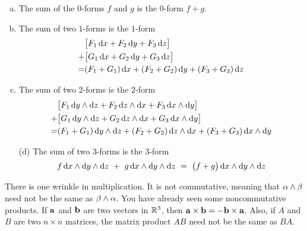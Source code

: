 \begin{defn}\label{def:differentialFormAdd}
\begin{enumerate}[(a)]
\item 
The sum of the $0$-forms  $f$ and $g$ is the $0$-form $f+g$.

\item
The sum of two $1$-forms is the $1$-form
\begin{align*} 
  &\big[F_1\,\mathrm{d}x
          + F_2\,\mathrm{d}y
          + F_3\,\mathrm{d}z\big] \\
  +&\big[G_1\,\mathrm{d}x
          + G_2\,\mathrm{d}y
          + G_3\,\mathrm{d}z\big] \\
 =& (F_1+G_1)\,\mathrm{d}x
          + (F_2+G_2)\,\mathrm{d}y
          + (F_3+G_3)\,\mathrm{d}z 
\end{align*}

\item
The sum of two $2$-forms is the $2$-form
\begin{align*} 
  &\big[F_1\,\mathrm{d}y\wedge\mathrm{d}z
          + F_2\,\mathrm{d}z\wedge\mathrm{d}x
          + F_3\,\mathrm{d}x\wedge\mathrm{d}y\big] \\
  +&\big[G_1\,\mathrm{d}y\wedge\mathrm{d}z
          + G_2\,\mathrm{d}z\wedge\mathrm{d}x
          + G_3\,\mathrm{d}x\wedge\mathrm{d}y\big] \\
  =&(F_1+G_1)\,\mathrm{d}y\wedge\mathrm{d}z
          + (F_2+G_2)\,\mathrm{d}z\wedge\mathrm{d}x
          + (F_3+G_3)\,\mathrm{d}x\wedge\mathrm{d}y 
\end{align*}

\end{enumerate}
\end{defn}

\addtocounter{theorem}{-1}
\begin{defn}[continued]
\begin{enumerate}[(a)]

\item[(d)]
The sum of two $3$-forms is the $3$-form
\begin{align*} 
   f\,\mathrm{d}x\wedge\mathrm{d}y\wedge\mathrm{d}z 
 \ +\  g\,\mathrm{d}x\wedge\mathrm{d}y\wedge\mathrm{d}z 
 \ =\  \big(f+g\big)\,\mathrm{d}x\wedge\mathrm{d}y\wedge\mathrm{d}z
\end{align*}
\end{enumerate}
\end{defn}


There is one wrinkle in multiplication. It is not commutative,
meaning that $\alpha\wedge\beta$ need not be the same as $\beta\wedge\alpha$.
You have already seen some noncommutative products. If $\mathbf{a}$ and $\mathbf{b}$
are two vectors in $\mathbb{R}^3$, then $\mathbf{a}\times\mathbf{b} = -\mathbf{b}\times \mathbf{a}$.
Also, if $A$ and $B$ are two $n\times n$ matrices, the matrix product 
$AB$ need not be the same  as $BA$. 


